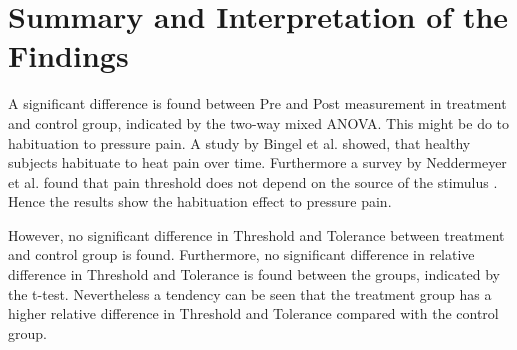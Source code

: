 \section{Summary and Interpretation of the Findings}


A significant difference is found between Pre and Post measurement in treatment and control group, indicated by the two-way mixed ANOVA. This might be do to habituation to pressure pain. A study by Bingel et al. \cite{Bingel2007} showed, that healthy subjects habituate to heat pain over time.  Furthermore a survey by Neddermeyer et al. \cite{Neddermeyer2007} found that pain threshold does not depend on the source of the stimulus . Hence the results show the habituation effect to pressure pain.

However, no significant difference in Threshold and Tolerance between treatment and control group is found. Furthermore, no significant difference in relative difference in Threshold and Tolerance is found between the groups, indicated by the t-test. Nevertheless a tendency can be seen that the treatment group has a higher relative difference in Threshold and Tolerance compared with the control group. 


